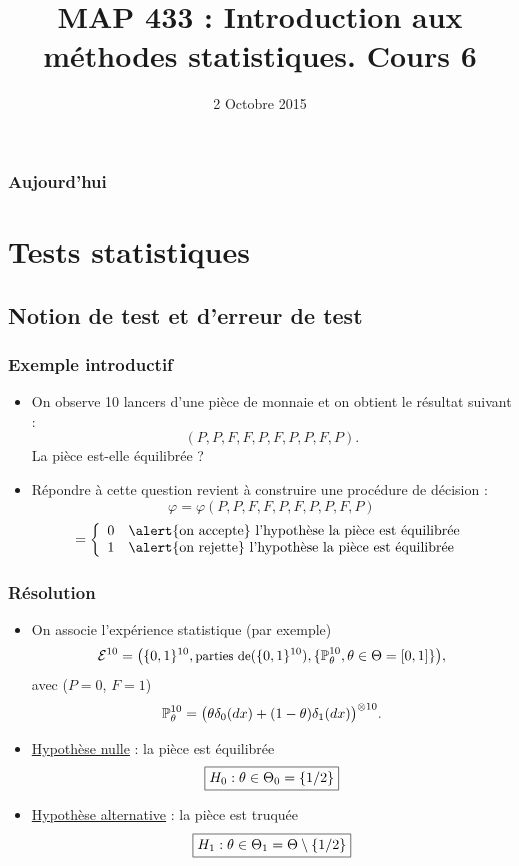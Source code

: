

\title{MAP 433 : Introduction aux méthodes statistiques. Cours 6}


\date{2 Octobre 2015}
\maketitle



\begin{frame}
\frametitle{Aujourd'hui}
\tableofcontents
\end{frame}


\section{Tests statistiques}

\subsection{Notion de test et d'erreur de test}



\begin{frame}
\frametitle{Exemple introductif}
\begin{itemize}
\item On observe 10 lancers d'une pièce de monnaie et on obtient le résultat suivant :
$$(P, P, F, F, P, F, P, P, F, P).$$
\alert{La pièce est-elle équilibrée} ?
\item \alert{Répondre} à cette question revient à \alert{construire une procédure de décision} :
$$\varphi = \varphi(P, P, F, F, P, F, P, P, F, P)$$
$$ =
\left\{
\begin{array}{ll}
0 & \text{\alert{on accepte} l'hypothèse  la pièce est équilibrée} \\
1 & \text{\alert{on rejette} l'hypothèse  la pièce est équilibrée}
\end{array}
\right.$$
\end{itemize}
\end{frame}

\begin{frame}
\frametitle{Résolution}
\begin{itemize}
\item On associe l'expérience statistique (par exemple)
$${\mathcal E}^{10} = \big(\{0,1\}^{10}, \text{{\small parties de}}(\{0,1\}^{10}), \{\operatorname{{\mathbb P}}_\theta^{10}, \theta \in \Theta = [0,1]\}\big),$$
avec ($P=0$, $F=1$)
$$\operatorname{{\mathbb P}}^{10}_\theta=\big(\theta\delta_{0}(dx)+(1-\theta)\delta_{1}(dx)\big)^{\otimes 10}.$$
\item\underline{Hypothèse nulle} :  \alert{  la pièce est équilibrée }
$$\boxed{H_0: \theta \in \Theta_0 = \{ 1/2\} }$$
\item \underline{Hypothèse alternative} :  \alert{ la pièce est truquée}
$$\boxed{H_1 : \theta \in \Theta_1 = \Theta \setminus \{1/2\}}$$
\end{itemize}
\end{frame}

